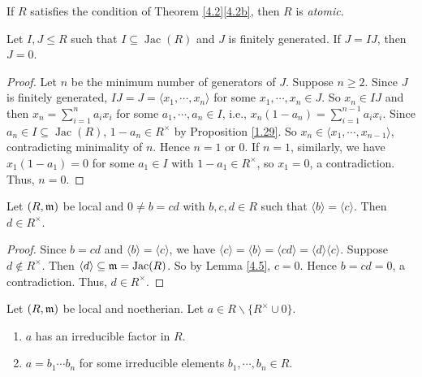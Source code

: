 \begin{definition}\label{4.4}
    If $R$ satisfies the condition of Theorem \ref{4.2}\ref{4.2b}, then $R$ is \emph{atomic}.
\end{definition}

\begin{lemma}\label{4.5}
    Let $I,J \leq R$ such that $I \subseteq \operatorname{Jac}(R)$ and $J$ is finitely generated. If $J = IJ$, then $J = 0$.
\end{lemma}

\begin{proof}
    Let $n$ be the minimum number of generators of $J$. Suppose $n \geq 2$. Since $J$ is finitely generated, $IJ = J = \langle x_1,\cdots,x_n \rangle$ for some $x_1,\cdots,x_n \in J$. So $x_n \in IJ$ and then $x_n = \sum_{i=1}^{n}a_ix_i$ for some $a_1,\cdots,a_n \in I$, i.e., $x_n(1-a_n) = \sum_{i=1}^{n-1}a_ix_i$. Since $a_n \in I \subseteq \operatorname{Jac}(R)$, $1-a_n \in R^{\times}$ by Proposition \ref{1.29}. So $x_n \in \langle x_1,\cdots,x_{n-1} \rangle$, contradicting minimality of $n$. Hence $n = 1$ or $0$. If $n = 1$, similarly, we have $x_1(1-a_1) = 0$ for some $a_1 \in I$ with $1-a_1 \in R^{\times}$, so $x_1 = 0$, a contradiction. Thus, $n = 0$.
\end{proof}

\begin{lemma}\label{4.6}
    Let $(R,\mathfrak{m})$ be local and $0 \neq b = cd$ with $b,c,d \in R$ such that $\langle b \rangle = \langle c \rangle$. Then $d \in R^{\times}$.
\end{lemma}

\begin{proof}
    Since $b = cd$ and $\langle b \rangle = \langle c \rangle$, we have $\langle c \rangle = \langle b \rangle = \langle cd \rangle = \langle d \rangle \langle c \rangle$. Suppose $d \not \in R^{\times}$. Then $\langle d \rangle \subseteq \mathfrak{m} = \operatorname{Jac}(R)$. So by Lemma \ref{4.5}, $c = 0$. Hence $b = cd = 0$, a contradiction. Thus, $d \in R^{\times}$.
\end{proof}

\begin{theorem}\label{4.7}
    Let $(R,\mathfrak{m})$ be local and noetherian. Let $a \in R \smallsetminus \{R^{\times} \cup 0\}$. 
    \begin{enumerate}
        \item $a$ has an irreducible factor in $R$.
        \item $a = b_1 \cdots b_n$ for some irreducible elements $b_1,\cdots,b_n \in R$.
    \end{enumerate}
\end{theorem}

